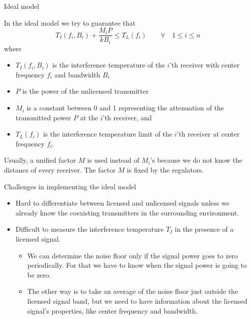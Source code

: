 \documentclass[mathserif]{beamer}
\begin{document}
\begin{frame}{Ideal model}

In the ideal model we try to guarantee that
\begin{equation}
    T_I(f_i,B_i) + \frac{M_iP}{kB_i} \leq T_L(f_i) \qquad \forall \quad 1 \leq i \leq n \label{idealModel}
\end{equation}
where

\pause
\begin{itemize}
	
	\item $T_I(f_i,B_i)$ is  the interference temperature of the $i$'th receiver with center frequency $f_i$ and bandwidth $B_i$
	\item $P$ is the power of the unlicensed transmitter
	\item $M_i$ is a constant between 0 and 1 representing the attenuation of the  transmitted power $P$ at the $i$'th receiver, and
	\item $T_L(f_i)$ is the interference temperature limit of the $i$'th receiver at center frequency $f_i$.
\end{itemize}

\pause
Usually, a unified factor $M$ is used instead of $M_i$'s because we do not know the distance of every receiver. The factor $M$ is fixed by the regulators.

\end{frame}

\begin{frame}{Challenges in implementing the ideal model}

\begin{itemize}
    \item Hard to differentiate between licensed and unlicensed signals unless we already know the coexisting transmitters in the surrounding environment.
    \item Difficult to measure the interference temperature $T_I$ in the presence of a licensed signal. \begin{itemize}
    \item We can determine the noise floor only if the signal power goes to zero periodically. For that we have to know when the signal power is going to be zero.
    \item The other way is to take an average of the noise floor just outside the licensed signal band, but we need to have information about the licensed signal's properties, like center frequency and bandwidth.
    \end{itemize}
\end{itemize}

\end{frame}
\end{document}
